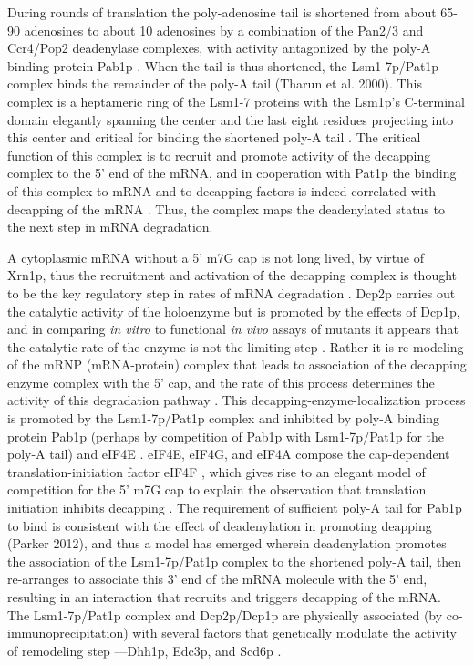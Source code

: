 During rounds of
translation the poly-adenosine tail is shortened from about 65-90
adenosines to about 10 adenosines by a combination of the Pan2/3 and
Ccr4/Pop2 deadenylase complexes, with activity antagonized by the
poly-A binding protein Pab1p
\parencite{parker2012rna,decker1993turnover}.
When the tail is thus shortened, the Lsm1-7p/Pat1p
complex binds the remainder of the poly-A tail (Tharun et al. 2000).
This complex is a heptameric ring of the Lsm1-7 proteins with the
Lsm1p's C-terminal domain elegantly spanning the center 
\parencite{sharif2013architecture}
and the last eight residues projecting into this center
and critical for binding the shortened poly-A tail 
\parencite{chowdhury2016mutagenic}.
The critical function of this complex is to recruit and promote
activity of the decapping complex to the 5' end of the mRNA, and in
cooperation with Pat1p \parencite{chowdhury2014pat1}
the binding of this
complex to mRNA and to decapping factors is indeed correlated with
decapping of the mRNA 
\parencite{chowdhury2009activation}.
Thus, the complex
maps the deadenylated status to the next step in mRNA degradation.  

A
cytoplasmic mRNA without a 5' m7G cap is not long lived, by virtue of
Xrn1p, thus the recruitment and activation of the decapping complex is
thought to be the key regulatory step in rates of mRNA degradation
\parencite{coller2004eukaryotic}.
Dcp2p carries out the catalytic activity of
the holoenzyme but is promoted by the effects of Dcp1p, and in
comparing \textit{in vitro} to functional \textit{in vivo} assays 
of mutants it appears
that the catalytic rate of the enzyme is not the limiting step 
\parencite{tharun1999analysis}. 
Rather it is re-modeling of the mRNP (mRNA-protein) complex that
leads to association of the decapping enzyme complex with the 5' cap,
and the rate of this process determines the activity of this
degradation pathway 
\parencite{tharun2001targeting}.
This
decapping-enzyme-localization process is promoted by the Lsm1-7p/Pat1p
complex and inhibited by poly-A binding protein Pab1p (perhaps by
competition of Pab1p with Lsm1-7p/Pat1p for the poly-A tail) and eIF4E
\parencite{coller2004eukaryotic,caponigro1996mechanisms}
. eIF4E, eIF4G, and
eIF4A compose the cap-dependent translation-initiation factor eIF4F
\parencite{dever2016mechanism}, 
which gives rise to an elegant model of competition for the 5' m7G cap
to explain the observation that
translation initiation inhibits decapping
\parencite{huch2014interrelations}.
The requirement of sufficient
poly-A tail for Pab1p to bind is consistent with the effect of
deadenylation in promoting deapping (Parker 2012), and thus a model
has emerged wherein deadenylation promotes the association of the 
Lsm1-7p/Pat1p complex to the shortened poly-A tail, then re-arranges
to associate this 3' end of the mRNA molecule with the 5' end,
resulting in an interaction that recruits and triggers decapping
of the mRNA. 
The Lsm1-7p/Pat1p
complex and Dcp2p/Dcp1p are physically associated (by
co-immunoprecipitation) with several factors that genetically modulate
the activity of remodeling step ---Dhh1p, Edc3p, and Scd6p 
\parencite{nissan2010decapping}.

